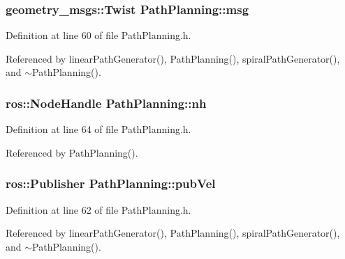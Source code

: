 \subsubsection[{\texorpdfstring{msg}{msg}}]{\setlength{\rightskip}{0pt plus 5cm}geometry\+\_\+msgs\+::\+Twist Path\+Planning\+::msg\hspace{0.3cm}{\ttfamily [private]}}\hypertarget{classPathPlanning_adc9393eeed2386dd694935a241d61dc2}{}\label{classPathPlanning_adc9393eeed2386dd694935a241d61dc2}


Definition at line 60 of file Path\+Planning.\+h.



Referenced by linear\+Path\+Generator(), Path\+Planning(), spiral\+Path\+Generator(), and $\sim$\+Path\+Planning().

\subsubsection[{\texorpdfstring{nh}{nh}}]{\setlength{\rightskip}{0pt plus 5cm}ros\+::\+Node\+Handle Path\+Planning\+::nh\hspace{0.3cm}{\ttfamily [private]}}\hypertarget{classPathPlanning_a1835423557580f21ff1d569e892cc0d5}{}\label{classPathPlanning_a1835423557580f21ff1d569e892cc0d5}


Definition at line 64 of file Path\+Planning.\+h.



Referenced by Path\+Planning().

\subsubsection[{\texorpdfstring{pub\+Vel}{pubVel}}]{\setlength{\rightskip}{0pt plus 5cm}ros\+::\+Publisher Path\+Planning\+::pub\+Vel\hspace{0.3cm}{\ttfamily [private]}}\hypertarget{classPathPlanning_a95ffa20c78692b3af113a52f37607f23}{}\label{classPathPlanning_a95ffa20c78692b3af113a52f37607f23}


Definition at line 62 of file Path\+Planning.\+h.



Referenced by linear\+Path\+Generator(), Path\+Planning(), spiral\+Path\+Generator(), and $\sim$\+Path\+Planning().

